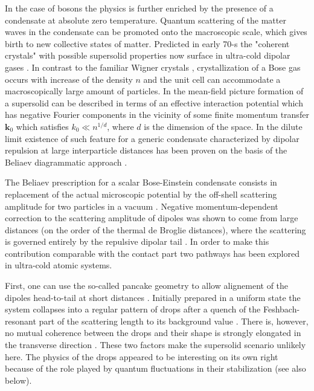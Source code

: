 \documentclass[reprint,superscriptaddress,showpacs,nofootinbib,aps,pra]{revtex4-1}
\begin{document}
In the case of bosons the physics is further enriched by the presence of a condensate at absolute zero temperature. Quantum scattering of the matter waves in the condensate can be promoted onto the macroscopic scale, which gives birth to new collective states of matter. Predicted in early 70-s the "coherent crystals" \cite{Kirzhnits, Nepomnyashchii} with possible supersolid properties now surface in ultra-cold dipolar gases \cite{Rosenzweig, Rotons, FragmentedSS}. In contrast to the familiar Wigner crystals \cite{Wigner}, crystallization of a Bose gas occurs with increase of the density $n$ and the unit cell can accommodate a macroscopically large amount of particles. In the mean-field picture formation of a supersolid can be described in terms of an effective interaction potential which has negative Fourier components in the vicinity of some finite momentum transfer $\bm k_0$ which satisfies $k_0 \ll n^{1/d}$, where $d$ is the dimension of the space. In the dilute limit existence of such feature for a generic condensate characterized by dipolar repulsion at large interparticle distances has been proven on the basis of the Beliaev diagrammatic approach \cite{RotonSpectrum, 1Dscattering}. 

The Beliaev prescription for a scalar Bose-Einstein condensate consists in replacement of the actual microscopic potential by the off-shell scattering amplitude for two particles in a vacuum \cite{Beliaev}. Negative momentum-dependent correction to the scattering amplitude of dipoles was shown to come from large distances (on the order of the thermal de Broglie distances), where the scattering is governed entirely by the repulsive dipolar tail \cite{DipolarScattering, 1Dscattering}. In order to make this contribution comparable with the contact part two pathways has been explored in ultra-cold atomic systems. 

First, one can use the so-called pancake geometry to allow alignement of the dipoles head-to-tail at short distances \cite{PancakeRotons, Review}. Initially prepared in a uniform state the system collapses into a regular pattern of drops after a quench of the Feshbach-resonant part of the scattering length to its background value \cite{Rosenzweig}. There is, however, no mutual coherence between the drops and their shape is strongly elongated in the transverse direction \cite{Filaments, Pfau}. These two factors make the supersolid scenario unlikely here. The physics of the drops appeared to be interesting on its own right because of the role played by quantum fluctuations in their stabilization \cite{ErbiumDrop, DysprosiumDrop, DipolarDropletsScience} (see also below).
\end{document}
